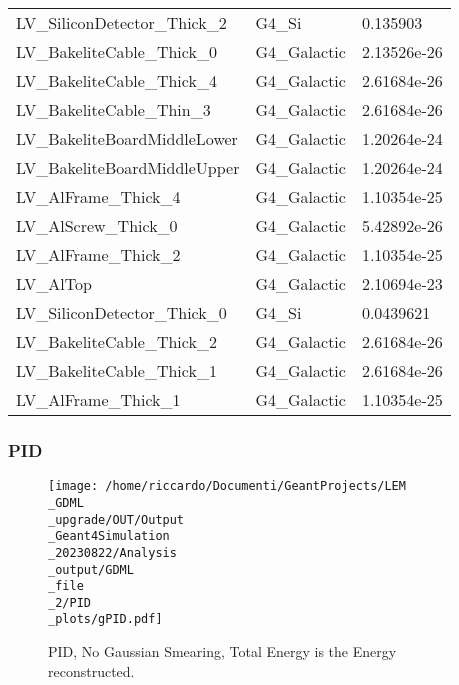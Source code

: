 \documentclass[8pt]{beamer}
\begin{document}
\begin{frame}
\begin{table}
\begin{tabular}{lll}
                        LV\_SiliconDetector\_Thick\_2 & G4\_Si & 0.135903\\
                        LV\_BakeliteCable\_Thick\_0 & G4\_Galactic & 2.13526e-26\\
                        LV\_BakeliteCable\_Thick\_4 & G4\_Galactic & 2.61684e-26\\
                        LV\_BakeliteCable\_Thin\_3 & G4\_Galactic & 2.61684e-26\\
                        LV\_BakeliteBoardMiddleLower & G4\_Galactic & 1.20264e-24\\
                        LV\_BakeliteBoardMiddleUpper & G4\_Galactic & 1.20264e-24\\
                        LV\_AlFrame\_Thick\_4 & G4\_Galactic & 1.10354e-25\\
                        LV\_AlScrew\_Thick\_0 & G4\_Galactic & 5.42892e-26\\
                        LV\_AlFrame\_Thick\_2 & G4\_Galactic & 1.10354e-25\\
                        LV\_AlTop & G4\_Galactic & 2.10694e-23\\
                        LV\_SiliconDetector\_Thick\_0 & G4\_Si & 0.0439621\\
                        LV\_BakeliteCable\_Thick\_2 & G4\_Galactic & 2.61684e-26\\
                        LV\_BakeliteCable\_Thick\_1 & G4\_Galactic & 2.61684e-26\\
                        LV\_AlFrame\_Thick\_1 & G4\_Galactic & 1.10354e-25\\
                        
            \bottomrule
            \end{tabular}
            \end{table}
            
            \end{frame}
            
            \begin{frame}
                \frametitle{PID}
            
        \begin{figure}[h]
            \centering
            \texttt{[image: /home/riccardo/Documenti/GeantProjects/LEM\\\_GDML\\\_upgrade/OUT/Output\\\_Geant4Simulation\\\_20230822/Analysis\\\_output/GDML\\\_file\\\_2/PID\\\_plots/gPID.pdf]}
            \caption{PID, No Gaussian Smearing, Total Energy is the Energy reconstructed.}
        \end{figure}
        
            \end{frame}
            
\end{document}
